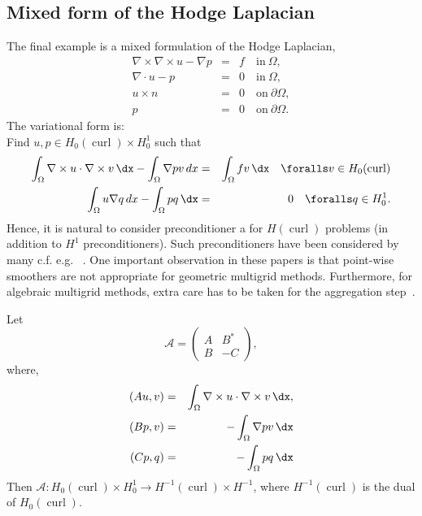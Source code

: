 \subsection{Mixed form of the Hodge Laplacian}
The final example is a mixed formulation
of the Hodge Laplacian, 
\begin{eqnarray}
\nabla \times \nabla \times u - \nabla p &=& f \quad \mbox{in} \ \Omega,    \label{mixed:hodge1} \\
\nabla \cdot u -p &=&  0 \quad \mbox{in} \ \Omega, \label{mixed:hodge2} \\
             u \times n &=&  0 \quad \mbox{on} \ \partial \Omega, \\  
             p          &=&  0 \quad \mbox{on} \ \partial \Omega.  
\end{eqnarray}
The variational form is: \\ 
Find $u, p \in H_0(\operatorname{curl}) \times H^1_0$ such that   
\begin{eqnarray}
\int_\Omega \nabla \times u \cdot \nabla \times v \, \dx    
- \int_\Omega \nabla p v \, dx  &=& \int_\Omega f v \, \dx  \quad \foralls v \in H_0(\operatorname{curl}) \\
 \int_\Omega u  \nabla q  \, dx - \int_\Omega p q \, \dx   &=& 0 \quad
 \foralls q \in H^1_0 . 
\end{eqnarray}
Hence, it is natural to consider preconditioner a for $H(\operatorname{curl})$ problems
(in addition to $H^1$ preconditioners). Such preconditioners have
been considered by many c.f. e.g.
~\citep{ArnoldFalkWinther1997a,ArnoldFalkWinther2000,Hiptmair1997,Hiptmair1999}.   
One important observation in these papers is that point-wise smoothers
are not appropriate for geometric multigrid methods. Furthermore, 
for algebraic multigrid methods, extra care has to be taken for the
aggregation step~\citep{GeeSiefertHuEtAl2006,HuTuminaroBochevEtAl2006}. 

Let 
\[
\mathcal{A}  =
\begin{pmatrix} A & B^* \\ B & -C \end{pmatrix}, 
\]
where, 
\begin{eqnarray}
(A u, v) &=& \int_\Omega \nabla \times u \cdot \nabla \times v \, \dx, \\    
(B p, v) &=&  - \int_\Omega \nabla p v \, \dx \\
(C p, q) &=&  - \int_\Omega p q \, \dx 
\end{eqnarray}
Then $\mathcal{A}: H_0(\operatorname{curl}) \times H^1_0 \rightarrow  H^{-1}(\operatorname{curl}) \times H^{-1}$, where   
$H^{-1}(\operatorname{curl})$ is the dual of   $H_0(\operatorname{curl})$.


